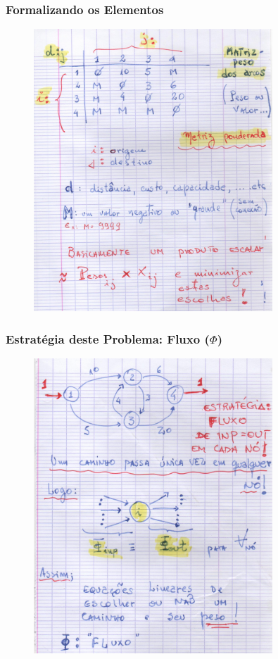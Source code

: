 \documentclass{beamer}
\begin{document}
\begin{frame}
	\frametitle{Formalizando os Elementos}
	
	\begin{figure}[tbp]
		\includegraphics[width=0.8\textwidth , height=0.8\textheight]{07_formalizando.pdf}
		\centering
	\end{figure}
\end{frame}


\begin{frame}
	\frametitle{Estratégia deste Problema: {\bf Fluxo} ($\Phi$)}
	
	\begin{figure}[tbp]
		\includegraphics[width=0.8\textwidth , height=0.8\textheight]{08_fluxo_por_no.pdf}
		\centering
	\end{figure}
\end{frame}
\end{document}
